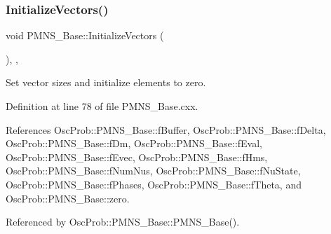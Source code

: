 \subsubsection{\texorpdfstring{Initialize\+Vectors()}{InitializeVectors()}}
{\footnotesize\ttfamily void P\+M\+N\+S\+\_\+\+Base\+::\+Initialize\+Vectors (\begin{DoxyParamCaption}{ }\end{DoxyParamCaption})\hspace{0.3cm}{\ttfamily [protected]}, {\ttfamily [virtual]}, {\ttfamily [inherited]}}

Set vector sizes and initialize elements to zero. 

Definition at line 78 of file P\+M\+N\+S\+\_\+\+Base.\+cxx.



References Osc\+Prob\+::\+P\+M\+N\+S\+\_\+\+Base\+::f\+Buffer, Osc\+Prob\+::\+P\+M\+N\+S\+\_\+\+Base\+::f\+Delta, Osc\+Prob\+::\+P\+M\+N\+S\+\_\+\+Base\+::f\+Dm, Osc\+Prob\+::\+P\+M\+N\+S\+\_\+\+Base\+::f\+Eval, Osc\+Prob\+::\+P\+M\+N\+S\+\_\+\+Base\+::f\+Evec, Osc\+Prob\+::\+P\+M\+N\+S\+\_\+\+Base\+::f\+Hms, Osc\+Prob\+::\+P\+M\+N\+S\+\_\+\+Base\+::f\+Num\+Nus, Osc\+Prob\+::\+P\+M\+N\+S\+\_\+\+Base\+::f\+Nu\+State, Osc\+Prob\+::\+P\+M\+N\+S\+\_\+\+Base\+::f\+Phases, Osc\+Prob\+::\+P\+M\+N\+S\+\_\+\+Base\+::f\+Theta, and Osc\+Prob\+::\+P\+M\+N\+S\+\_\+\+Base\+::zero.



Referenced by Osc\+Prob\+::\+P\+M\+N\+S\+\_\+\+Base\+::\+P\+M\+N\+S\+\_\+\+Base().


